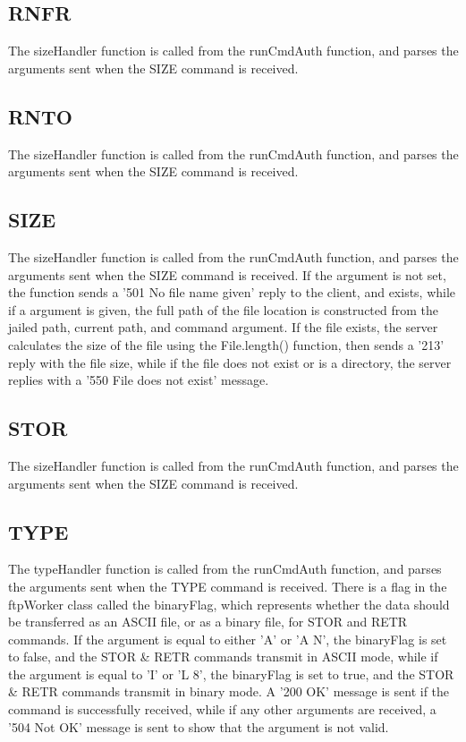 \documentclass[11pt,a4paper,titlepage]{article}
\begin{document}
\subsection{RNFR}
The sizeHandler function is called from the runCmdAuth function, and parses the arguments sent when the SIZE command is received.

\subsection{RNTO}
The sizeHandler function is called from the runCmdAuth function, and parses the arguments sent when the SIZE command is received.

\subsection{SIZE}
The sizeHandler function is called from the runCmdAuth function, and parses the arguments sent when the SIZE command is received. If the argument is not set, the function sends a '501 No file name given' reply to the client, and exists, while if a argument is given, the full path of the file location is constructed from the jailed path, current path, and command argument. If the file exists, the server calculates the size of the file using the File.length() function, then sends a '213' reply with the file size, while if the file does not exist or is a directory, the server replies with a '550 File does not exist' message.

\subsection{STOR}
The sizeHandler function is called from the runCmdAuth function, and parses the arguments sent when the SIZE command is received.

\subsection{TYPE}
The typeHandler function is called from the runCmdAuth function, and parses the arguments sent when the TYPE command is received. There is a flag in the ftpWorker class called the binaryFlag, which represents whether the data should be transferred as an ASCII file, or as a binary file, for STOR and RETR commands. If the argument is equal to either 'A' or 'A N', the binaryFlag is set to false, and the STOR \& RETR commands transmit in ASCII mode, while if the argument is equal to 'I' or 'L 8', the binaryFlag is set to true, and the STOR \& RETR commands transmit in binary mode. A '200 OK' message is sent if the command is successfully received, while if any other arguments are received, a '504 Not OK' message is sent to show that the argument is not valid.
\end{document}
